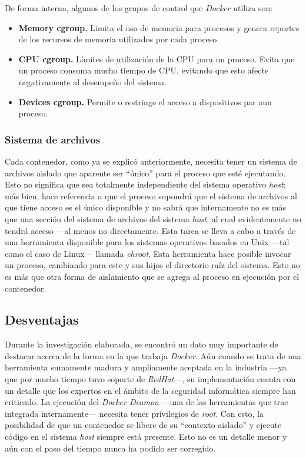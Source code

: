 \documentclass[12pt, letterpaper]{article}
\begin{document}
De forma interna, algunos de los grupos de control que \textit{Docker} utiliza 
son:
\begin{itemize}
  \item \textbf{Memory cgroup.} Limita el uso de memoria para procesos y 
    genera reportes de los recursos de memoria utilizados por cada proceso.
  \item \textbf{CPU cgroup.} Límites de utilización de la CPU para un proceso.  
    Evita que un proceso consuma mucho tiempo de CPU, evitando que esto afecte 
    negativamente al desempeño del sistema.
  \item \textbf{Devices cgroup.} Permite o restringe el acceso a dispositivos 
    par aun proceso.
\end{itemize}

\subsubsection{Sistema de archivos}
Cada contenedor, como ya se explicó anteriormente, necesita tener un sistema 
de archivos aislado que aparente ser ``único'' para el proceso que esté 
ejecutando. Esto no significa que sea totalmente independiente del sistema 
operativo \textit{host}; más bien, hace referencia a que el proceso supondrá 
que el sistema de archivos al que tiene acceso es el único disponible y no 
sabrá que internamente no es más que una sección del sistema de archivos del 
sistema \textit{host}, al cual evidentemente no tendrá acceso ---al menos no 
directamente. Esta tarea se lleva a cabo a través de una herramienta 
disponible para los sistemas operativos basados en Unix ---tal como el caso de 
Linux--- llamada \textit{chroot}. Esta herramienta hace posible invocar un 
proceso, cambiando para este y sus hijos el directorio raíz del sistema. Esto 
no es más que otra forma de aislamiento que se agrega al proceso en ejecución 
por el contenedor.

\subsection{Desventajas}
Durante la investigación elaborada, se encontró un dato muy importante de 
destacar acerca de la forma en la que trabaja \textit{Docker}. Aún cuando se 
trata de una herramienta sumamente madura y ampliamente aceptada en la 
industria ---ya que por mucho tiempo tuvo soporte de \textit{RedHat}---, su 
implementación cuenta con un detalle que los expertos en el ámbito de la 
seguridad informática siempre han criticado. La ejecución del \textit{Docker 
Deamon} ---una de las herramientas que trae integrada internamente--- necesita 
tener privilegios de \textit{root}. Con esto, la posibilidad de que un 
contenedor se libere de su ``contexto aislado'' y ejecute código en el sistema 
\textit{host} siempre está presente. Esto no es un detalle menor y aún con el 
paso del tiempo nunca ha podido ser corregido.
\end{document}
